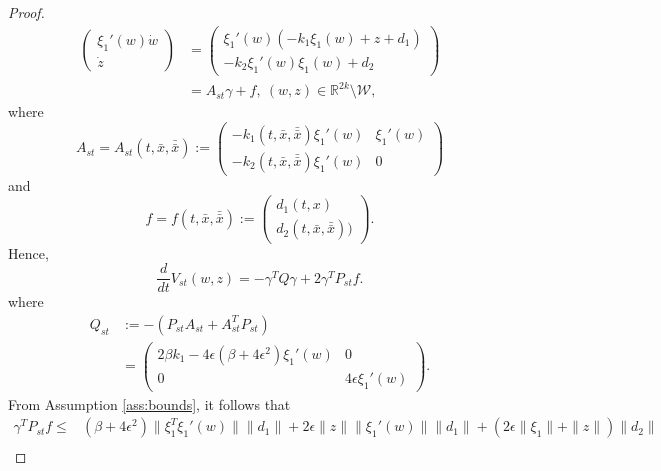 \documentclass[onecolumn]{IEEEtran}
\newtheorem{proof}{Proof}
\begin{document}
\begin{proof}
\begin{equation*}
\begin{split}
\begin{pmatrix}
	\xi_1'(w) \dot w\\
	\dot z
	\end{pmatrix}&=\begin{pmatrix}
	\xi_1'(w)\left(-k_1\xi_1(w)+z+d_1\right)\\
	-k_2\xi_1'(w)\xi_1(w)+d_2
	\end{pmatrix}\\
	&=A_{st}\gamma +f,\: (w,z)\in \mathbb{R}^{2k}\setminus \mathcal{W},
	\end{split}
	\end{equation*} 
	where
	\begin{equation*}
	A_{st}=A_{st}(t,\bar x,\bar {\bar x}):=\begin{pmatrix}
	-k_1(t,\bar x,\bar {\bar x})\xi_1'(w) & \xi_1'(w)\\
	-k_2(t,\bar x,\bar {\bar x})\xi_1'(w) & 0
	\end{pmatrix} 
	\end{equation*}
	and
	\begin{equation*}
	f=f(t,\bar x,\bar {\bar x}):=\begin{pmatrix}
	d_1(t,x)\\
	d_2(t,\bar x,\bar {\bar x}))
	\end{pmatrix}.
	\end{equation*}
	Hence,
	\begin{equation*}
	\dfrac{d}{dt}V_{st}(w,z)=-\gamma^TQ\gamma+2\gamma^TP_{st}f.
	\end{equation*}
	where
	\begin{align*}
	Q_{st}&:=-\left(P_{st}A_{st}+ A_{st}^TP_{st}\right)\\
	&=\begin{pmatrix}
	2\beta k_1-4\epsilon \left( \beta+4\epsilon^2\right)\xi_1'(w) & 0\\
	0 & 4\epsilon \xi_1'(w)
	\end{pmatrix}.
	\end{align*}
	From Assumption \ref{ass:bounds},  it follows  that
	\begin{equation*}
	\begin{split}
	\gamma^TP_{st}f\leq& (\beta+4\epsilon^2)\|\xi_1^T\xi_1'(w)\|\|d_1\|+2\epsilon \|z\|\|\xi_1'(w)\|\|d_1\|+\left(2\epsilon \|\xi_1\|+\|z\|\right)\|d_2\|\\

\end{split}
\end{equation*}
\end{proof}
\end{document}
